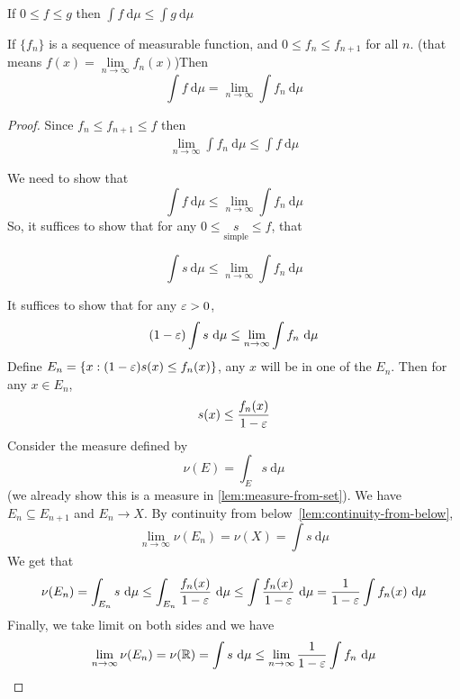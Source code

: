 \begin{remark}
  If $0 \le f \leq g$ then $\int f \ \mathrm{d}\mu \leq \int g \ \mathrm{d}\mu$
\end{remark}

\begin{theorem}
  If $\{f_n\}$ is a sequence of measurable function, and $0 \le f_n \le f_{n+1}$ for all $n$. 
  (that means $f(x) = \lim\limits_{n\to\infty}f_n(x)$)Then
  \[\int f\ \mathrm{d}\mu = \lim_{n\to\infty}\int f_n\ \mathrm{d}\mu\]
\end{theorem}

\begin{proof}

  Since $f_n \le f_{n+1} \le f$ then 
  \begin{align*}
    \lim_{n\to\infty}\int f_n\ \mathrm{d}\mu \le \int f\ \mathrm{d}\mu
  \end{align*}

  We need to show that $$\int f \ \mathrm{d}\mu\le \lim\limits_{n\to\infty} \int f_n\ \mathrm{d}\mu$$
  So, it suffices to show that for any $0 \le \underset{\text{simple}}s \le f$, that 

  $$\int s\ \mathrm{d}\mu \le \lim\limits_{n\to\infty} \int f_n\ \mathrm{d}\mu$$

  It suffices to show that for any $\varepsilon > 0$, 
  $$(1-\varepsilon)\int s\ \mathrm{d}\mu \le \lim_{n\to\infty} \int f_n\ \mathrm{d}\mu$$
  Define $E_n = \{x : (1 - \varepsilon)s(x) \le f_n(x)\}$, any $x$ will be in one of the $E_n$.
  Then for any $x \in E_n$, 
  $$s(x) \le \frac{f_n(x)}{1-\varepsilon}$$
  Consider the measure defined by $$\nu(E) = \int_E s\ \mathrm{d}\mu$$ (we already show this is a measure in \ref{lem:measure-from-set}).
  We have $E_n \subseteq E_{n+1}$ and $E_n \to X$. By continuity from below~\ref{lem:continuity-from-below}, 
  $$\lim\limits_{n\to\infty}\nu(E_n) = \nu(X) = \int s\ \mathrm{d}\mu$$
  We get that
  $$\nu(E_n) = \int_{E_n} s\ \mathrm{d}\mu \le \int_{E_n} \frac{f_n(x)}{1-\eps}\ \mathrm{d}\mu \leq \int\frac{f_n(x)}{1-\eps}\ \mathrm{d}\mu = \frac1{1-\eps}\int f_n(x)\ \mathrm{d}\mu$$
  Finally, we take limit on both sides and we have 
  $$\lim_{n\to\infty}\nu(E_n) = \nu(\RR) = \int s\ \mathrm{d}\mu \le \lim_{n\to\infty} \frac1{1-\eps} \int f_n\ \mathrm{d}\mu$$
\end{proof}

